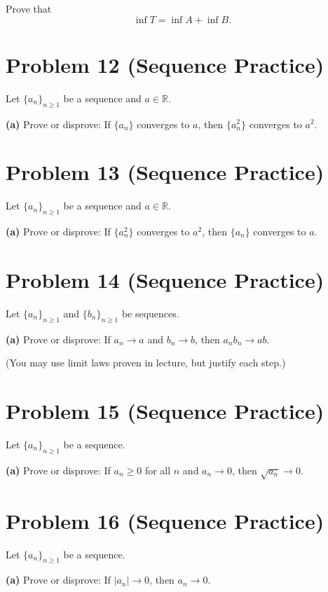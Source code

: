 \documentclass[12pt]{article}
\begin{document}
Prove that
\[
\inf T = \inf A + \inf B.
\]

\vfill

\newpage

\section*{Problem 12 (Sequence Practice)}

Let $\{a_n\}_{n\ge 1}$ be a sequence and $a \in \mathbb{R}$.

\textbf{(a)} Prove or disprove: If $\{a_n\}$ converges to $a$, then $\{a_n^2\}$ converges to $a^2$.

\vfill

\newpage

\section*{Problem 13 (Sequence Practice)}

Let $\{a_n\}_{n\ge 1}$ be a sequence and $a \in \mathbb{R}$.

\textbf{(a)} Prove or disprove: If $\{a_n^2\}$ converges to $a^2$, then $\{a_n\}$ converges to $a$.

\vfill

\newpage

\section*{Problem 14 (Sequence Practice)}

Let $\{a_n\}_{n\ge 1}$ and $\{b_n\}_{n\ge 1}$ be sequences.

\textbf{(a)} Prove or disprove: If $a_n \to a$ and $b_n \to b$, then $a_n b_n \to ab$.

(You may use limit laws proven in lecture, but justify each step.)

\vfill

\newpage

\section*{Problem 15 (Sequence Practice)}

Let $\{a_n\}_{n\ge 1}$ be a sequence.

\textbf{(a)} Prove or disprove: If $a_n \ge 0$ for all $n$ and $a_n \to 0$, then $\sqrt{a_n} \to 0$.

\vfill

\newpage

\section*{Problem 16 (Sequence Practice)}

Let $\{a_n\}_{n\ge 1}$ be a sequence.

\textbf{(a)} Prove or disprove: If $|a_n| \to 0$, then $a_n \to 0$.

\vfill
\end{document}
